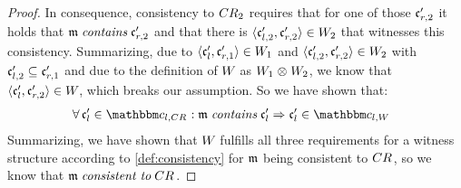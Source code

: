 \begin{proof}
    In consequence, consistency to $\consistencyrelation{CR}{2}$ requires that for one of those $\conditionelement{c}{r,2}'$ it holds that $\modeltuple{m} \containsmath \conditionelement{c}{r,2}'$ and that there is $\tupled{\conditionelement{c}{l,2}', \conditionelement{c}{r,2}'} \in \consistencyrelation{W}{2}$ that witnesses this consistency.
    Summarizing, due to $\tupled{\conditionelement{c}{l}', \conditionelement{c}{r,1}'} \in \consistencyrelation{W}{1}$ and $\tupled{\conditionelement{c}{l,2}', \conditionelement{c}{r,2}'} \in \consistencyrelation{W}{2}$ with $\conditionelement{c}{l,2}' \subseteq \conditionelement{c}{r,1}'$ and due to the definition of $\consistencyrelation{W}{}$ as $\consistencyrelation{W}{1} \concat \consistencyrelation{W}{2}$, we know that $\tupled{\conditionelement{c}{l}', \conditionelement{c}{r,2}'} \in \consistencyrelation{W}{}$, which breaks our assumption.
    So we have shown that:
    \begin{align*}
        &
        \forall \conditionelement{c}{l}' \in \condition{c}{l,\consistencyrelation{CR}{}} : \modeltuple{m} \containsmath \conditionelement{c}{l}' \Rightarrow \conditionelement{c}{l}' \in \condition{c}{l,\consistencyrelation{W}{}}
    \end{align*}
    Summarizing, we have shown that $\consistencyrelation{W}{}$ fulfills all three requirements for a witness structure according to \autoref{def:consistency} for $\modeltuple{m}$ being consistent to $\consistencyrelation{CR}{}$, so we know that $\modeltuple{m} \consistenttomath \consistencyrelation{CR}{}$.

\end{proof}

